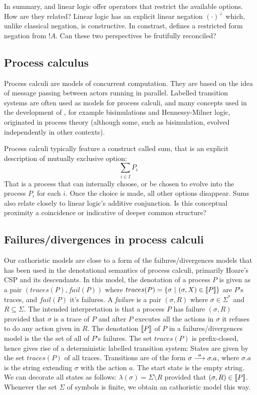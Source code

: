 In summary, \cathoristic{} and linear logic offer  operators that restrict
the available options. How are they related? Linear logic has an
explicit linear negation $(\cdot)^{\bot}$ which, unlike classical
negation, is constructive. In constrast, \cathoristic{} defines a restricted
form negation from $!A$. Can these two perspectives be frutifully
reconciled?

\subsection{Process calculus}

Process calculi are models of concurrent computation.  They are based
on the idea of message passing between actors running in parallel.
Labelled transition systems are often used as models for process
calculi, and many concepts used in the development of \cathoristic{},
for example bisimulations and Hennessy-Milner logic, originated in
process theory (although some, such as bisimulation, evolved
independently in other contexts).

Process calculi typically feature a construct called sum, that is an
explicit description of mutually exclusive option:
\[
     \sum_{i \in I} P_i
\]
That is a process that can internally choose, or be chosen to evolve
into the process $P_i$ for each $i$. Once the choice is made, all
other options disappear.  Sums also relate closely to linear logic's
additive conjunction. Is this conceptual proximity a coincidence or
indicative of deeper common structure?


\subsection{Failures/divergences in process calculi}

Our cathoristic models are close to a form of the failures/divergences
models that has been used in the denotational semantics of process
calculi, primarily Hoare's CSP \cite{HoareC:comseq,RoscoeAW:theapoc}
and its descendants.  In this model, the denotation of a process $P$
is given as a pair $(traces(P), fail(P))$ where $traces(P) = \{
\sigma\ |\ (\sigma, X) \in \lbrack\!\lbrack P \rbrack\!\rbrack \}$ are $P$'s traces, and
$fail(P)$ it's failures.  A \emph{failure} is a pair $(\sigma, R)$
where $\sigma \in \Sigma^*$ and $R \subseteq \Sigma$. The intended
interpretation is that a process $P$ has failure $(\sigma, R)$
provided that $\sigma$ is a trace of $P$ and after $P$ executes all
the actions in $\sigma$ it refuses to do any action given in $R$. The
denotation $\lbrack\!\lbrack P \rbrack\!\rbrack$ of $P$ in a failures/divergences model is the
the set of all of $P$'s failures. The set $ traces(P)$ is
prefix-closed, hence gives rise of a deterministic labelled transition
system: States are given by the set $traces(P)$ of all traces.
Transitions are of the form $\sigma \stackrel{a}{\longrightarrow} \sigma.a$, where
$\sigma.a$ is the string extending $\sigma$ with the action $a$.  The
start state is the empty string.  We can decorate all states as
follows: $ \lambda (\sigma) = \Sigma \setminus R $ provided that
$(\sigma, R) \in \lbrack\!\lbrack P \rbrack\!\rbrack$.  Whenever the set $\Sigma$ of symbols is
finite, we obtain an cathoristic model this way.

